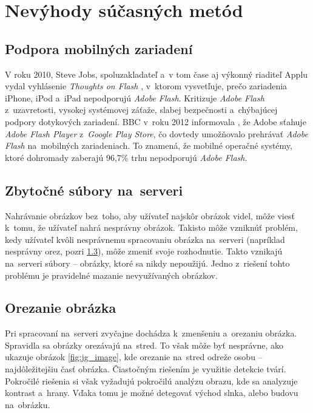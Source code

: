 \graphicspath{ {img/23/} }

\chapter{Nevýhody súčasných metód}
\section{Podpora mobilných zariadení}
\label{sec:mobile-support}

V roku 2010, Steve Jobs, spoluzakladateľ a~v tom čase aj výkonný riaditeľ Applu vydal vyhlásenie \emph{Thoughts on Flash} \cite{Apple_flash}, v~ktorom vysvetľuje, prečo zariadenia iPhone, iPod a~iPad nepodporujú \emph{Adobe Flash}. Kritizuje \emph{Adobe Flash} z~uzavretosti, vysokej systémovej záťaže, slabej bezpečnosti a~chýbajúcej podpory dotykových zariadení.
BBC v~roku 2012 informovala \cite{Android_flash}, že Adobe sťahuje \emph{Adobe Flash Player} z~\emph{Google Play Store}, čo dovtedy umožňovalo prehrávať \emph{Adobe Flash} na~mobilných zariadeniach. To znamená, že mobilné operačné systémy, ktoré dohromady zaberajú 96,7\% trhu \cite{Mobile_OS_share} nepodporujú \emph{Adobe Flash}.


\section{Zbytočné súbory na~serveri}

Nahrávanie obrázkov bez~toho, aby užívateľ najskôr obrázok videl, môže viesť k~tomu, že užívateľ nahrá nesprávny obrázok. Takisto môže vzniknúť problém, kedy užívateľ kvôli nesprávnemu spracovaniu obrázka na~serveri (napríklad nesprávny orez, pozri \ref{sec:orezanie-obrazka}), môže zmeniť svoje rozhodnutie. Takto vznikajú na~serveri súbory -- obrázky, ktoré sa nikdy nepoužijú. Jedno z~riešení tohto problému je pravidelné mazanie nevyužívaných obrázkov.   

\section{Orezanie obrázka}
\label{sec:orezanie-obrazka}

Pri spracovaní na~serveri zvyčajne dochádza k~zmenšeniu a~orezaniu obrázka. Spravidla sa obrázky orezávajú na~stred. To však môže byť nesprávne, ako ukazuje obrázok \ref{fig:jg_image}, kde orezanie na~stred odreže osobu -- najdôležitejšiu časť obrázka. Čiastočným riešením je využitie detekcie tvárí. Pokročilé riešenia si však vyžadujú pokročilú analýzu obrazu, kde sa analyzuje kontrast a~hrany. Vďaka tomu je možné detegovať východ slnka, alebo budovu na~obrázku. 

